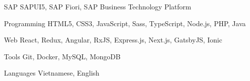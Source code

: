 


\begin{cvskills}


\cvskill
{SAP}
{SAPUI5, SAP Fiori, SAP Business Technology Platform}


\cvskill
{Programming}
{HTML5, CSS3, JavaScript, Sass, TypeScript, Node.js, PHP, Java}


\cvskill
{Web}
{React, Redux, Angular, RxJS, Express.js, Next.js, GatsbyJS, Ionic}


\cvskill
{Tools}
{Git, Docker, MySQL, MongoDB}


\cvskill
{Languages}
{Vietnamese, English}


\end{cvskills}